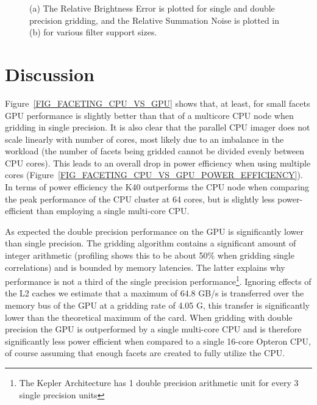 \begin{figure}[ht!]
\begin{mdframed}
\begin{subfigure}[b]{0.95\textwidth}
    \caption{}
  \end{subfigure}

  \caption[Relative precision error with increasing filter support]{(a) The Relative Brightness Error is plotted for single and double precision gridding, and the Relative Summation Noise is plotted in (b) for various filter support sizes.}
  \label{FIG_RBE_SUP}
  \end{mdframed}
\end{figure}
\section{Discussion}
Figure~\ref{FIG_FACETING_CPU_VS_GPU} shows that, at least, for small facets GPU performance is slightly better than that of a multicore CPU node when gridding in
single precision. It is also clear that the parallel CPU imager does not scale linearly with number of cores, most likely due to an imbalance in the workload (the number of
facets being gridded cannot be divided evenly between CPU cores). This leads to an overall drop in power
efficiency when using multiple cores (Figure~\ref{FIG_FACETING_CPU_VS_GPU_POWER_EFFICIENCY}). In terms of power efficiency the K40 outperforms the CPU node when 
comparing the peak performance of the CPU cluster at 64 cores, but is slightly less power-efficient than employing a single multi-core CPU.

As expected the double precision performance on the GPU is significantly lower than single precision. The gridding algorithm contains a significant amount of
integer arithmetic (profiling shows this to be about 50\% when gridding single correlations) and 
is bounded by memory latencies. The latter explains why performance is not a third of the single precision
performance\footnote{The Kepler Architecture has 1 double precision arithmetic unit for every 3 single precision units}. 
Ignoring effects of the L2 caches we estimate that a maximum of 64.8 GB/s is transferred over the memory bus of the GPU at a gridding rate of 
4.05 G, this transfer is significantly lower than the theoretical maximum of the card. When gridding with double precision the GPU is outperformed 
by a single multi-core CPU and is therefore significantly less power efficient when compared to a single 16-core Opteron CPU, of course assuming 
that enough facets are created to fully utilize the CPU.

